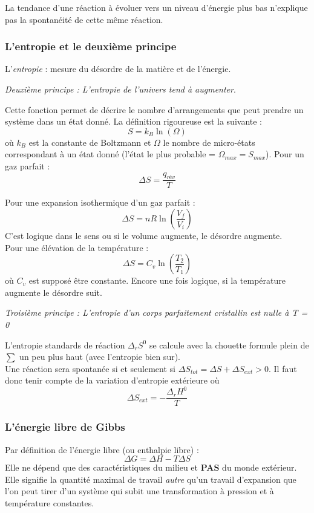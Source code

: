 \documentclass[12pt, a4paper]{article}
\begin{document}
La tendance d'une réaction à évoluer vers un niveau d'énergie plus bas n'explique pas la spontanéité de cette même réaction. 

\subsubsection{L'entropie et le deuxième principe}
L'\textit{entropie} : mesure du désordre de la matière et de l'énergie.
\begin{center}
\textit{Deuxième principe : L'entropie de l'univers tend à augmenter}.
\end{center}
Cette fonction permet de décrire le nombre d'arrangements que peut prendre un système dans un état donné. La définition rigoureuse est la suivante : 
$$S = k_B \ln(\Omega)$$
où $k_B$ est la constante de Boltzmann et $\Omega$ le nombre de micro-états correspondant à un état donné (l'état le plus probable = $\Omega_{max} = S_{max}$). Pour un gaz parfait : 
$$\Delta S = \frac{q_{rév}}{T}$$

Pour une expansion isothermique d'un gaz parfait : 
$$\Delta S = nR\ln\left(\frac{V_f}{V_i}\right)$$
C'est logique dans le sens ou si le volume augmente, le désordre augmente.\\

Pour une élévation de la température : 
$$\Delta S = C_v \ln\left(\frac{T_2}{T_1}\right)$$
où $C_v$ est supposé être constante. Encore une fois logique, si la température augmente le désordre suit. 
\begin{center}
\textit{Troisième principe : L'entropie d'un corps parfaitement cristallin est nulle à T = 0}
\end{center}
L'entropie standards de réaction $\Delta_r S^0$ se calcule avec la chouette formule plein de $\sum$ un peu plus haut (avec l'entropie bien sur).\\

Une réaction sera spontanée si et seulement si $\Delta S_{tot} = \Delta S + \Delta S_{ext} > 0$. Il faut donc tenir compte de la variation d'entropie extérieure où
$$\Delta S_{ext} = -\frac{\Delta_rH^0}{T}$$


\subsubsection{L'énergie libre de Gibbs}
Par définition de l'énergie libre (ou enthalpie libre) : 
$$\Delta G = \Delta H - T \Delta S$$
Elle ne dépend que des caractéristiques du milieu et \textbf{PAS} du monde extérieur.  Elle signifie la quantité maximal de travail \textit{autre} qu'un travail d'expansion que l'on peut tirer d'un système qui subit une transformation à pression et à température constantes.\\
\end{document}
